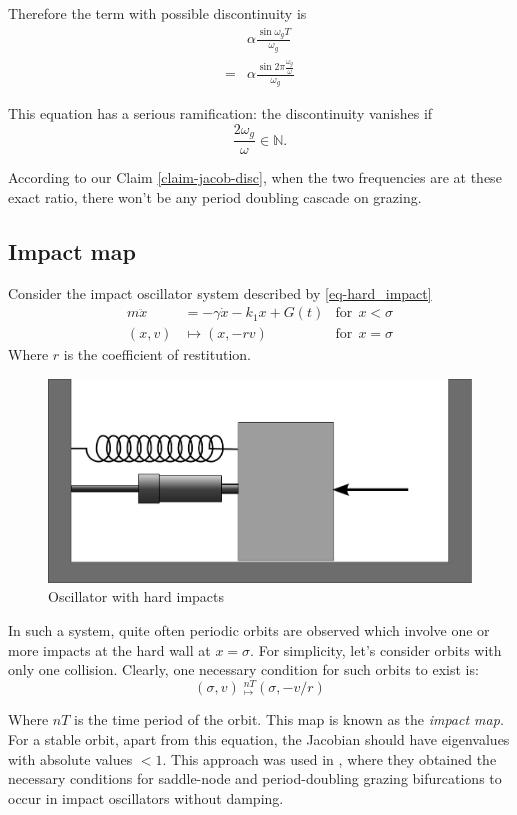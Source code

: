 \documentclass{book}
\renewcommand{\(}{\begin{columns}}
\renewcommand{\)}{\end{columns}}
\newcommand{\<}[1]{\begin{column}{#1}}
\renewcommand{\>}{\end{column}}
\begin{document}
Therefore the term with possible discontinuity is
\begin{align}
&\alpha\frac{\sin{\omega_g T}}{\omega_g}\\
=&\alpha\frac{\sin{2\pi\frac{\omega_g}{\omega}}}{\omega_g}
\end{align}

This equation has a serious ramification: the discontinuity vanishes if 
\begin{equation}
\label{eq-cond-chaos-vanish}
\frac{2\omega_g}{\omega}\in\mathbb{N}.
\end{equation}

According to our Claim \ref{claim-jacob-disc}, when the two frequencies are at these exact ratio, 
there won't be any period doubling cascade on grazing.  
\subsection{Impact map}
\label{subsec-impact-map}
Consider the impact oscillator system described by \eqref{eq-hard_impact}
\begin{align}
m\ddot{x}&=-\gamma \dot{x}-k_1x+G(t)&\mathrm{for}~~x<\sigma\\
(x,v)&\mapsto (x,-rv)&\mathrm{for}~~x=\sigma
\end{align}
Where $r$ is the coefficient of restitution.  

\begin{figure}
\caption{Oscillator with hard impacts}
\begin{center}
\includegraphics[width=0.5\columnwidth]{hardcol}
\end{center}
\end{figure}

In such a system, quite often periodic orbits are observed which involve one 
or more impacts at the hard wall at $x=\sigma$. For simplicity, let's consider 
orbits with only one collision. Clearly, one necessary condition 
for such orbits to exist is:
\[
(\sigma,v)\phantom{.}^{nT}_{\mapsto}(\sigma,-v/r)
\]

Where $nT$ is the time period of the orbit.  This map is known as the 
\emph{impact map}. For a stable orbit, apart from this equation, the Jacobian 
should have eigenvalues with absolute values $<1$. This approach was used
in \cite[Ch.~2;~p.~20]{bernardo-book}, where they obtained the necessary conditions 
for saddle-node and period-doubling grazing bifurcations to occur in impact 
oscillators without damping.  
\end{document}
